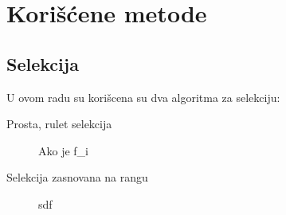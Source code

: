 \documentclass[titlepage]{article}
\begin{document}
    \section{Kori\v{s}\'{c}ene metode}
        \subsection{Selekcija}
        U ovom radu su kori\v{s}cena su dva algoritma za selekciju:
        \begin{description}
          \item[Prosta, rulet selekcija] Ako je f_i 
          \item[Selekcija zasnovana na rangu] sdf
        \end{description}
    
	
\end{document}
